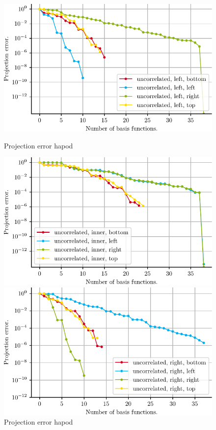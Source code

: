 \documentclass[a4paper]{eccomas_paper-2024}
\begin{document}

\begin{figure}[!htb]
  \includegraphics[width=\linewidth]{../figures/beam/fig_proj_error_left_hapod.pdf}
  \caption{Projection error hapod}\label{fig:proj_error_left_hapod}
\endminipage\hfill
{}
  \includegraphics[width=\linewidth]{../figures/beam/fig_proj_error_inner_hapod.pdf}
  \caption{Projection error hapod}\label{fig:proj_error_inner_hapod}
\endminipage\hfill
{}%
  \includegraphics[width=\linewidth]{../figures/beam/fig_proj_error_right_hapod.pdf}

\end{figure}
\end{document}

